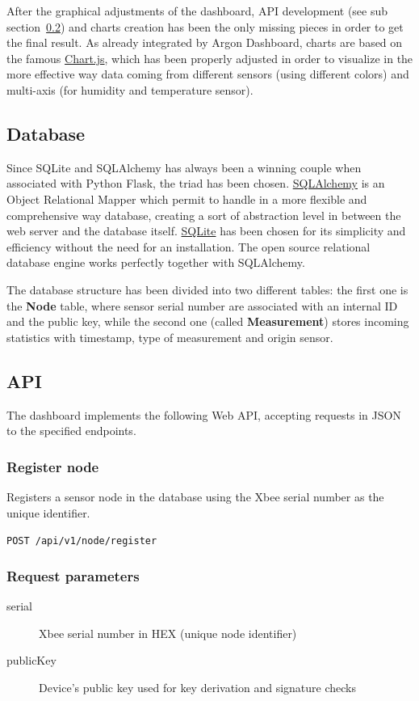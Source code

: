 \documentclass[a4paper,11pt]{scrartcl}
\begin{document}
After the graphical adjustments of the dashboard, API development (see sub section~\ref{subsec:api}) and charts creation has been the only missing pieces in order to get the final result. As already integrated by Argon Dashboard, charts are based on the famous \href{https://www.chartjs.org/}{Chart.js}, which has been properly adjusted in order to visualize in the more effective way data coming from different sensors (using different colors) and multi-axis (for humidity and temperature sensor).

\subsection{Database}\label{subsec:database}
Since SQLite and SQLAlchemy has always been a winning couple when associated with Python Flask, the triad has been chosen.
\href{https://www.sqlalchemy.org/}{SQLAlchemy} is an Object Relational Mapper which permit to handle in a more flexible and comprehensive way database, creating a sort of abstraction level in between the web server and the database itself. \href{https://www.sqlite.org/index.html}{SQLite} has been chosen for its simplicity and efficiency without the need for an installation. The open source relational database engine works perfectly together with SQLAlchemy.

The database structure has been divided into two different tables: the first one is the \textbf{Node} table, where sensor serial number are associated with an internal ID and the public key, while the second one (called \textbf{Measurement}) stores incoming statistics with timestamp, type of measurement and origin sensor.

\subsection{API}\label{subsec:api}
The dashboard implements the following Web API, accepting requests in JSON to the specified endpoints.

\subsubsection{Register node}
Registers a sensor node in the database using the Xbee serial number as the unique identifier.

\texttt{POST /api/v1/node/register}

\subsubsection*{Request parameters}
\begin{description}
\item[serial] Xbee serial number in HEX (unique node identifier)
\item[publicKey] Device's public key used for key derivation and signature checks
\end{description}
\end{document}
